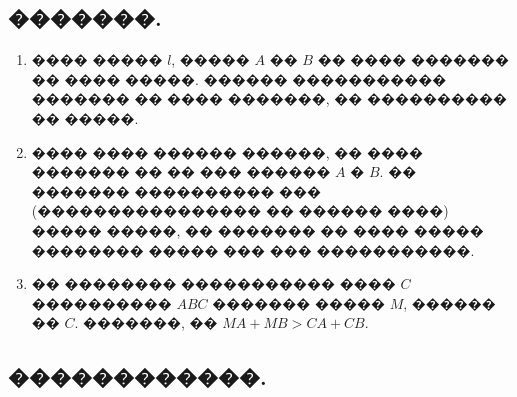\documentclass[a4paper,12pt]{article}
\begin{document}
\newpage

\begin{center}
\section*{�������.}
\end{center}

\medskip\medskip\medskip

\begin{enumerate}

\item ���� ����� $l$, ����� $A$ �� $B$ �� ���� ������� �� ���� �����. ������ ����������� ������� �� ���� �������, �� ���������� �� �����.

\item ���� ���� ������ ������, �� ���� ������� �� �� ��� ������ $A$ � $B$. �� ������� ���������� ��� (���������������� �� ������ ����) ����� �����, �� ������� �� ���� ����� �������� ����� ��� ��� �����������.

\item �� �������� ����������� ���� $C$ ���������� $ABC$ ������� ����� $M$, ������ �� $C$. �������, �� $MA+MB>CA+CB$.

\end{enumerate}







\newpage

\begin{center}
\section*{������������.}
\end{center}

\medskip\medskip\medskip
\end{document}
